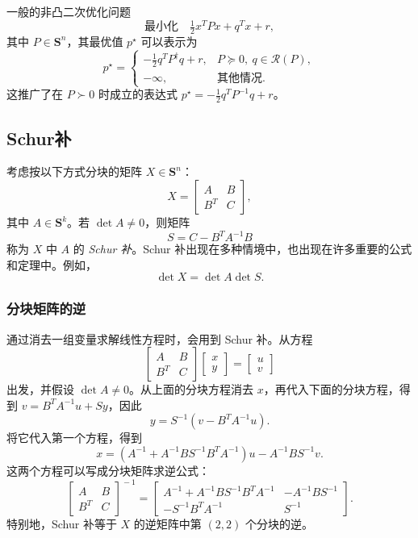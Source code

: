 一般的非凸二次优化问题
\[
 \text{最小化}\quad\tfrac12x^TPx+q^Tx+r,
\]
其中 $P\in\mathbf S^n$，其最优值 $p^\star$ 可以表示为
\[
 p^\star=\begin{cases}-\tfrac12q^TP^\dagger q+r,&P\succeq0,\ q\in\mathcal R(P),\\-\infty,&\text{其他情况}.\end{cases}
\]
这推广了在 $P\succ0$ 时成立的表达式 $p^\star=-\tfrac12q^TP^{-1}q+r$。

\subsection{Schur补}
考虑按以下方式分块的矩阵 $X\in\mathbf S^n$：
\[
 X=\begin{bmatrix}A&B\\B^T&C\end{bmatrix},
\]
其中 $A\in\mathbf S^k$。若 $\det A\neq0$，则矩阵
\[
 S=C-B^TA^{-1}B
\]
称为 $X$ 中 $A$ 的 \emph{Schur 补}。Schur 补出现在多种情境中，也出现在许多重要的公式和定理中。例如，
\[
 \det X=\det A\det S.
\]

\subsubsection*{分块矩阵的逆}
通过消去一组变量求解线性方程时，会用到 Schur 补。从方程
\[
 \begin{bmatrix}A&B\\B^T&C\end{bmatrix}\begin{bmatrix}x\\y\end{bmatrix}=\begin{bmatrix}u\\v\end{bmatrix}
\]
出发，并假设 $\det A\neq0$。从上面的分块方程消去 $x$，再代入下面的分块方程，得到 $v=B^TA^{-1}u+Sy$，因此
\[
 y=S^{-1}(v-B^TA^{-1}u).
\]
将它代入第一个方程，得到
\[
 x=(A^{-1}+A^{-1}BS^{-1}B^TA^{-1})u-A^{-1}BS^{-1}v.
\]
这两个方程可以写成分块矩阵求逆公式：
\[
 \begin{bmatrix}A&B\\B^T&C\end{bmatrix}^{\!-1}
 =\begin{bmatrix}
 A^{-1}+A^{-1}BS^{-1}B^TA^{-1}&-A^{-1}BS^{-1}\\
 -S^{-1}B^TA^{-1}&S^{-1}
 \end{bmatrix}.
\]
特别地，Schur 补等于 $X$ 的逆矩阵中第 $(2,2)$ 个分块的逆。

